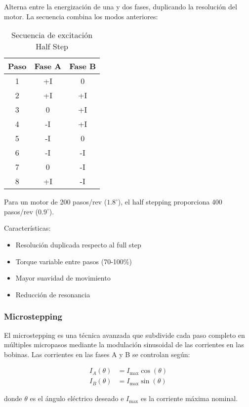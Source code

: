 Alterna entre la energización de una y dos fases, duplicando la resolución del motor. La secuencia combina los modos anteriores:

\begin{table}[ht]
\centering
\begin{tabular}{|c|c|c|}
\hline
\textbf{Paso} & \textbf{Fase A} & \textbf{Fase B} \\
\hline
1 & +I & 0 \\
2 & +I & +I \\
3 & 0 & +I \\
4 & -I & +I \\
5 & -I & 0 \\
6 & -I & -I \\
7 & 0 & -I \\
8 & +I & -I \\
\hline
\end{tabular}
\caption{Secuencia de excitación Half Step}
\end{table}

Para un motor de 200 pasos/rev ($1.8^\circ$), el half stepping proporciona 400 pasos/rev ($0.9^\circ$).

Características:
\begin{itemize}
    \item Resolución duplicada respecto al full step
    \item Torque variable entre pasos (70-100\%)
    \item Mayor suavidad de movimiento
    \item Reducción de resonancia
\end{itemize}

\subsubsection{Microstepping}

El microstepping es una técnica avanzada que subdivide cada paso completo en múltiples micropasos mediante la modulación sinusoidal de las corrientes en las bobinas. Las corrientes en las fases A y B se controlan según:

\begin{equation}
\begin{aligned}
I_A(\theta) &= I_{\max} \cos(\theta) \\
I_B(\theta) &= I_{\max} \sin(\theta)
\end{aligned}
\end{equation}

donde $\theta$ es el ángulo eléctrico deseado e $I_{\max}$ es la corriente máxima nominal.

